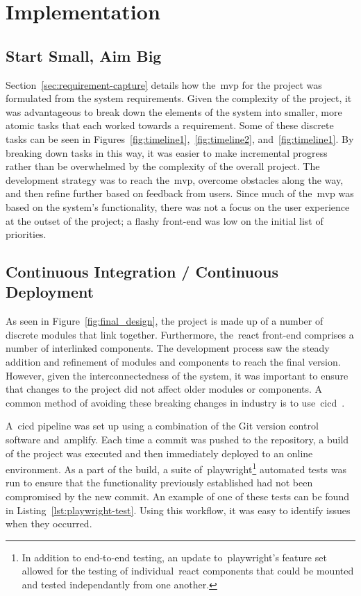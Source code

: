 \thispagestyle{plain}
\newpage
\section{Implementation}\label{sec:implementation}

\normalsize

\subsection{Start Small, Aim Big}\label{subsec:start-small-aim-big}

Section~\ref{sec:requirement-capture} details how the~\gls{mvp} for the project was formulated from the system requirements.
Given the complexity of the project,
it was advantageous to break down the elements of the system into smaller,
more atomic tasks that each worked towards a requirement.
Some of these discrete tasks can be seen in Figures~\ref{fig:timeline1},~\ref{fig:timeline2}, and~\ref{fig:timeline1}.
By breaking down tasks in this way,
it was
easier to make incremental progress
rather than be overwhelmed by the complexity of the overall project.
The development strategy was to reach the~\gls{mvp}, overcome obstacles along the way,
and then refine further based on feedback from users.
Since much of the~\gls{mvp} was based on the system's functionality,
there was not a focus on the user experience at the outset of the project;
a flashy front-end was low on the initial list of priorities.

\subsection{Continuous Integration / Continuous Deployment}\label{subsec:continuous-integration-continuous-deployment}

As seen in Figure~\ref{fig:final_design}, the project is made up of a number of discrete modules that link together.
Furthermore, the~\gls{react} front-end comprises a number of interlinked components.
The development process saw the steady addition and refinement of modules and components to reach the final version.
However, given the interconnectedness of the system,
it was important to ensure that changes to the project did not affect older modules or components.
A common method of avoiding these breaking changes in industry is
to use~\gls{cicd}~\citep{duvall2007continuous, miller-ci}.

A~\gls{cicd} pipeline was set up using a combination of the Git version control software and~\gls{amplify}.
Each time a commit was pushed to the repository,
a build of the project was executed and then immediately deployed to an online environment.
As a part of the build,
a suite of~\gls{playwright}\footnote{In addition to end-to-end testing, an update to~\gls{playwright}'s feature set allowed for the testing of individual~\gls{react} components that could be mounted and tested independantly from one another.} automated tests was run
to ensure that the functionality previously established had not been compromised by the new commit.
An example of one of these tests can be found in Listing~\ref{lst:playwright-test}.
Using this workflow, it was easy to identify issues when they occurred.

